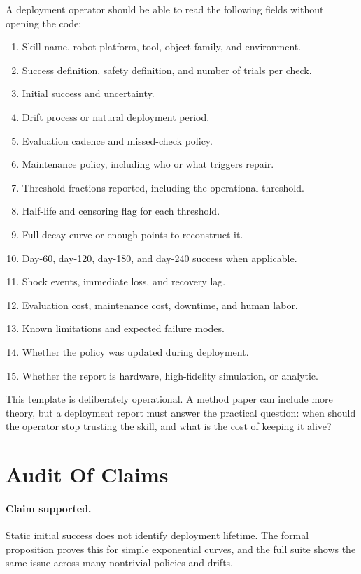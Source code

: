 \documentclass{article}
\begin{document}
A deployment operator should be able to read the following fields without
opening the code:
\begin{enumerate}
    \item Skill name, robot platform, tool, object family, and environment.
    \item Success definition, safety definition, and number of trials per check.
    \item Initial success and uncertainty.
    \item Drift process or natural deployment period.
    \item Evaluation cadence and missed-check policy.
    \item Maintenance policy, including who or what triggers repair.
    \item Threshold fractions reported, including the operational threshold.
    \item Half-life and censoring flag for each threshold.
    \item Full decay curve or enough points to reconstruct it.
    \item Day-60, day-120, day-180, and day-240 success when applicable.
    \item Shock events, immediate loss, and recovery lag.
    \item Evaluation cost, maintenance cost, downtime, and human labor.
    \item Known limitations and expected failure modes.
    \item Whether the policy was updated during deployment.
    \item Whether the report is hardware, high-fidelity simulation, or analytic.
\end{enumerate}

This template is deliberately operational. A method paper can include more
theory, but a deployment report must answer the practical question: when should
the operator stop trusting the skill, and what is the cost of keeping it alive?

\section{Audit Of Claims}

\paragraph{Claim supported.}
Static initial success does not identify deployment lifetime. The formal
proposition proves this for simple exponential curves, and the full suite shows
the same issue across many nontrivial policies and drifts.
\end{document}
